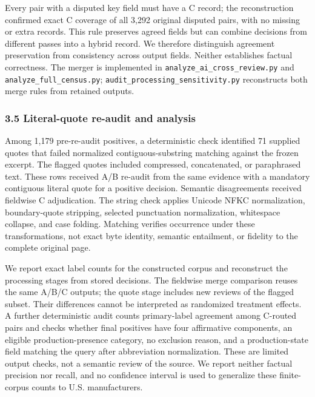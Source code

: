 \documentclass[10pt]{article}
\begin{document}
Every pair with a disputed key field must have a C record; the reconstruction confirmed exact C coverage of all 3,292 original disputed pairs, with no missing or extra records. This rule preserves agreed fields but can combine decisions from different passes into a hybrid record. We therefore distinguish agreement preservation from consistency across output fields. Neither establishes factual correctness. The merger is implemented in \texttt{analyze\_ai\_cross\_review.py} and \texttt{analyze\_full\_census.py}; \texttt{audit\_processing\_sensitivity.py} reconstructs both merge rules from retained outputs.

\hypertarget{literal-quote-re-audit-and-analysis}{%
\subsubsection{3.5 Literal-quote re-audit and analysis}\label{literal-quote-re-audit-and-analysis}}

Among 1,179 pre-re-audit positives, a deterministic check identified 71 supplied quotes that failed normalized contiguous-substring matching against the frozen excerpt. The flagged quotes included compressed, concatenated, or paraphrased text. These rows received A/B re-audit from the same evidence with a mandatory contiguous literal quote for a positive decision. Semantic disagreements received fieldwise C adjudication. The string check applies Unicode NFKC normalization, boundary-quote stripping, selected punctuation normalization, whitespace collapse, and case folding. Matching verifies occurrence under these transformations, not exact byte identity, semantic entailment, or fidelity to the complete original page.

We report exact label counts for the constructed corpus and reconstruct the processing stages from stored decisions. The fieldwise merge comparison reuses the same A/B/C outputs; the quote stage includes new reviews of the flagged subset. Their differences cannot be interpreted as randomized treatment effects. A further deterministic audit counts primary-label agreement among C-routed pairs and checks whether final positives have four affirmative components, an eligible production-presence category, no exclusion reason, and a production-state field matching the query after abbreviation normalization. These are limited output checks, not a semantic review of the source. We report neither factual precision nor recall, and no confidence interval is used to generalize these finite-corpus counts to U.S. manufacturers.
\end{document}
